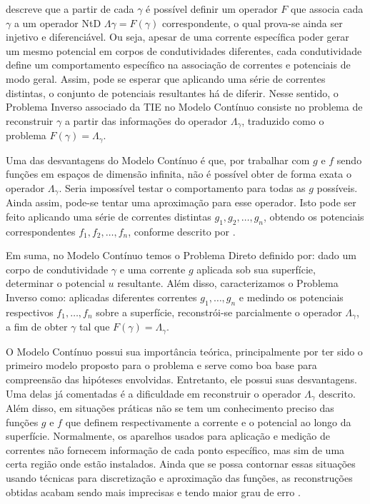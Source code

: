  descreve que a partir de cada $\gamma$ é possível definir um operador $F$ que associa cada $\gamma$ a um operador NtD $\Lambda \gamma = F(\gamma)$ correspondente, o qual prova-se ainda ser injetivo e diferenciável. Ou seja, apesar de uma corrente específica poder gerar um mesmo potencial em corpos de condutividades diferentes, cada condutividade define um comportamento específico na associação de correntes e potenciais de modo geral. Assim, pode se esperar que aplicando uma série de correntes distintas, o conjunto de potenciais resultantes há de diferir. Nesse sentido, o Problema Inverso associado da TIE no Modelo Contínuo consiste no problema de reconstruir $\gamma$ a partir das informações do operador $\Lambda_\gamma$, traduzido como o problema $F(\gamma) = \Lambda_\gamma$. 

Uma das desvantagens do Modelo Contínuo é que, por trabalhar com $g$ e $f$ sendo funções em espaços de dimensão infinita, não é possível obter de forma exata o operador $\Lambda_\gamma$. Seria impossível testar o comportamento para todas as $g$ possíveis. Ainda assim, pode-se tentar uma aproximação para esse operador. Isto pode ser feito aplicando uma série de correntes distintas $g_1,g_2,\dots,g_n$, obtendo os potenciais correspondentes $f_1,f_2,\dots,f_n$, conforme descrito por .

Em suma, no Modelo Contínuo temos o Problema Direto definido por: dado um corpo de condutividade $\gamma$ e uma corrente $g$ aplicada sob sua superfície, determinar o potencial $u$ resultante. Além disso, caracterizamos o Problema Inverso como: aplicadas diferentes correntes $g_1,\dots,g_n$ e medindo os potenciais respectivos $f_1,\dots,f_n$ sobre a superfície, reconstrói-se parcialmente o operador $\Lambda_\gamma$, a fim de obter $\gamma$ tal que $F(\gamma)=\Lambda_\gamma$.

O Modelo Contínuo possui sua importância teórica, principalmente por ter sido o primeiro modelo proposto para o problema e serve como boa base para compreensão das hipóteses envolvidas. Entretanto, ele possui suas desvantagens. Uma delas já comentadas é a dificuldade em reconstruir o operador $\Lambda_\gamma$ descrito. Além disso, em situações práticas não se tem um conhecimento preciso das funções $g$ e $f$ que definem respectivamente a corrente e o potencial ao longo da superfície. Normalmente, os aparelhos usados para aplicação e medição de correntes não fornecem informação de cada ponto específico, mas sim de uma certa região onde estão instalados.  Ainda que se possa contornar essas situações usando técnicas para discretização e aproximação das funções, as reconstruções obtidas acabam sendo mais imprecisas e tendo maior grau de erro \cite{margotti}. 

